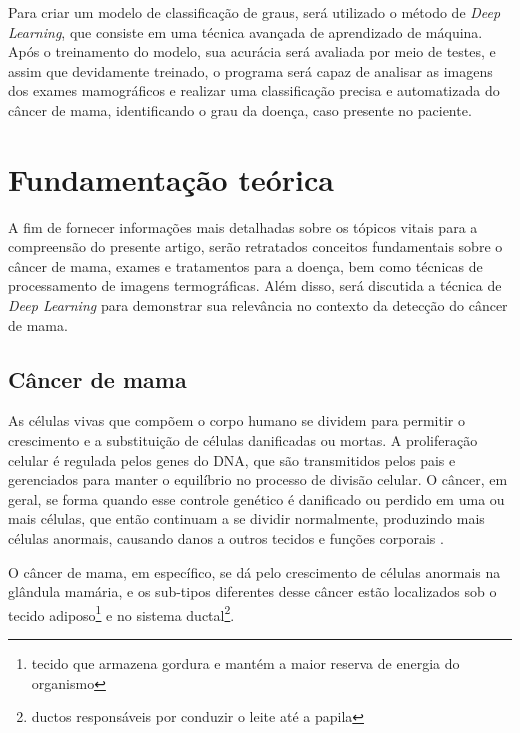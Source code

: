 

Para criar um modelo de classificação de graus, será utilizado o método de \textit{Deep Learning}, que consiste em uma técnica avançada de aprendizado de máquina. Após o treinamento do modelo, sua acurácia será avaliada por meio de testes, e assim que devidamente treinado, o programa será capaz de analisar as imagens dos exames mamográficos e realizar uma classificação precisa e automatizada do câncer de mama, identificando o grau da doença, caso presente no paciente.


\section{Fundamentação teórica} %
A fim de fornecer informações mais detalhadas sobre os tópicos vitais para a compreensão do presente artigo, serão retratados conceitos fundamentais sobre o câncer de mama, exames e tratamentos para a doença, bem como técnicas de processamento de imagens termográficas. Além disso, será discutida a técnica de \textit{Deep Learning} para demonstrar sua relevância no contexto da detecção do câncer de mama.

\subsection{Câncer de mama}
As células vivas que compõem o corpo humano se dividem para permitir o crescimento e a substituição de células danificadas ou mortas. A proliferação celular é regulada pelos genes do DNA, que são transmitidos pelos pais e gerenciados para manter o equilíbrio no processo de divisão celular. O câncer, em geral, se forma quando esse controle genético é danificado ou perdido em uma ou mais células, que então continuam a se dividir normalmente, produzindo mais células anormais, causando danos a outros tecidos e funções corporais \cite{basicOncology}.

O câncer de mama, em específico, se dá pelo crescimento de células anormais na glândula mamária, e os sub-tipos diferentes desse câncer estão localizados sob o tecido adiposo\footnote{tecido que armazena gordura e mantém a maior reserva de energia do organismo} e no sistema ductal\footnote{ductos responsáveis por conduzir o leite até a papila}. 


